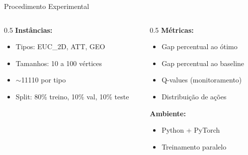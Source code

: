 \documentclass[11pt, xcolor=dvipsnames]{beamer}
\begin{document}
\begin{frame}{Procedimento Experimental}
  \footnotesize
  \begin{columns}[T]
    \begin{column}{0.5\textwidth}
      \textbf{Instâncias:}
      \begin{itemize}
        \item Tipos: EUC\_2D, ATT, GEO
        \item Tamanhos: 10 a 100 vértices
        \item $\sim$11110 por tipo
        \item Split: 80\% treino, 10\% val, 10\% teste
      \end{itemize}
    \end{column}
    \begin{column}{0.5\textwidth}
      \textbf{Métricas:}
      \begin{itemize}
        \item Gap percentual ao ótimo
        \item Gap percentual ao baseline
        \item Q-values (monitoramento)
        \item Distribuição de ações
      \end{itemize}
      \vspace{2mm}
      \textbf{Ambiente:}
      \begin{itemize}
        \item Python + PyTorch
        \item Treinamento paralelo
      \end{itemize}
    \end{column}
  \end{columns}
\end{frame}
\end{document}
